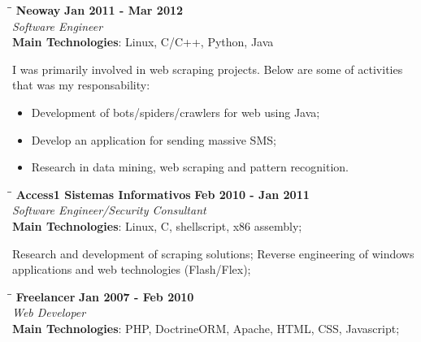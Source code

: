 \documentclass[margin]{res}
\begin{document}
\begin{resume}
   \begin{tabbing}
   \hspace{2.3in}\= \hspace{1.7in}\= \kill %
    \textbf{Neoway}    \>\>\textbf{Jan 2011 - Mar 2012}\\
    \textit{Software Engineer}\\   
    \textbf{Main Technologies}: Linux, C/C++, Python, Java
   \end{tabbing}\vspace{-20pt}      %
    \vspace{2mm}
    I was primarily involved in web scraping projects. Below are some of activities that was my responsability:
    
    \begin{itemize}
  \item Development of bots/spiders/crawlers for web using Java;
  \item Develop an application for sending massive SMS;
  \item Research in data mining, web scraping and pattern recognition.
\end{itemize}

   
   \vspace{2mm}
   \begin{tabbing}
   \hspace{2.3in}\= \hspace{1.5in}\= \kill %
    \textbf{Access1 Sistemas Informativos}    \>\>\textbf{Feb 2010 - Jan 2011}\\
    \textit{Software Engineer/Security Consultant}\\   
    \textbf{Main Technologies}: Linux, C, shellscript, x86 assembly;
   \end{tabbing}\vspace{-20pt}      %
    \vspace{2mm}
    
    Research and development of scraping solutions;
    Reverse engineering of windows applications and web technologies (Flash/Flex);
    
       
   \vspace{2mm}
   \begin{tabbing}
   \hspace{2.3in}\= \hspace{1.5in}\= \kill %
    \textbf{Freelancer}    \>\>\textbf{Jan 2007 - Feb 2010}\\
    \textit{Web Developer}\\   
    \textbf{Main Technologies}: PHP, DoctrineORM, Apache, HTML, CSS, Javascript;
   \end{tabbing}\vspace{-20pt}      %
    \vspace{2mm}
    

\end{resume}
\end{document}
